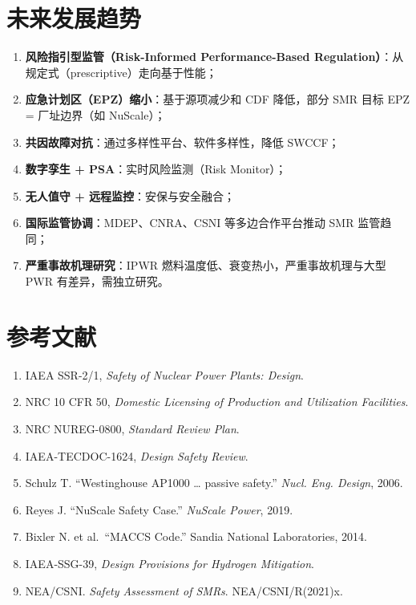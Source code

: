 \documentclass[
  UTF8,
  scheme=plain,
  fontsize=10pt,
  openany
]{ctexbook}
\begin{document}
\section{未来发展趋势}\label{ux672aux6765ux53d1ux5c55ux8d8bux52bf}

\begin{enumerate}
\def\labelenumi{\arabic{enumi}.}
\tightlist
\item
  \textbf{风险指引型监管（Risk-Informed Performance-Based
  Regulation）}：从规定式（prescriptive）走向基于性能；
\item
  \textbf{应急计划区（EPZ）缩小}：基于源项减少和 CDF 降低，部分 SMR 目标
  EPZ = 厂址边界（如 NuScale）；
\item
  \textbf{共因故障对抗}：通过多样性平台、软件多样性，降低 SWCCF；
\item
  \textbf{数字孪生 + PSA}：实时风险监测（Risk Monitor）；
\item
  \textbf{无人值守 + 远程监控}：安保与安全融合；
\item
  \textbf{国际监管协调}：MDEP、CNRA、CSNI 等多边合作平台推动 SMR
  监管趋同；
\item
  \textbf{严重事故机理研究}：IPWR
  燃料温度低、衰变热小，严重事故机理与大型 PWR 有差异，需独立研究。
\end{enumerate}

\section{参考文献}\label{ux53c2ux8003ux6587ux732e-7}

\begin{enumerate}
\def\labelenumi{\arabic{enumi}.}
\tightlist
\item
  IAEA SSR-2/1, \emph{Safety of Nuclear Power Plants: Design}.
\item
  NRC 10 CFR 50, \emph{Domestic Licensing of Production and Utilization
  Facilities}.
\item
  NRC NUREG-0800, \emph{Standard Review Plan}.
\item
  IAEA-TECDOC-1624, \emph{Design Safety Review}.
\item
  Schulz T. ``Westinghouse AP1000 \ldots{} passive safety.'' \emph{Nucl.
  Eng. Design}, 2006.
\item
  Reyes J. ``NuScale Safety Case.'' \emph{NuScale Power}, 2019.
\item
  Bixler N. et al.~``MACCS Code.'' Sandia National Laboratories, 2014.
\item
  IAEA-SSG-39, \emph{Design Provisions for Hydrogen Mitigation}.
\item
  NEA/CSNI. \emph{Safety Assessment of SMRs}. NEA/CSNI/R(2021)x.
\end{enumerate}
\end{document}
